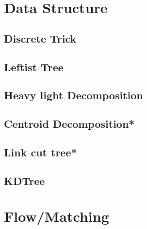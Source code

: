 \section{Data Structure}
\subsection{Discrete Trick}

\subsection{Leftist Tree}

\subsection{Heavy light Decomposition}

\subsection{Centroid Decomposition*} %

% 
% 
\subsection{Link cut tree*} %

\subsection{KDTree}

% 


\section{Flow/Matching}
% 
% 
